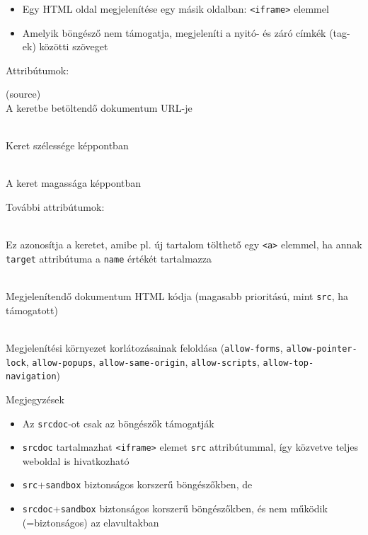\begin{frame}
  \begin{itemize}
    \item Egy HTML oldal megjelenítése egy másik oldalban: \texttt{<iframe>} elemmel
    \item Amelyik böngésző nem támogatja, megjeleníti a nyitó- és záró címkék (tag-ek) közötti szöveget
  \end{itemize}
  Attribútumok:
  \begin{description}[m]
    \item[\texttt{src}] (source) \hfill \\ A keretbe betöltendő dokumentum URL-je
    \item[\texttt{width}] \hfill \\ Keret szélessége képpontban
    \item[\texttt{height}] \hfill \\ A keret magassága képpontban
  \end{description}
\end{frame}

\begin{frame}
  További attribútumok:
  \begin{description}[m]
    \item[\texttt{name}] \hfill \\ Ez azonosítja a keretet, amibe pl. új tartalom tölthető egy \texttt{<a>} elemmel, ha annak \texttt{target} attribútuma a \texttt{name} értékét tartalmazza
    \item[\texttt{srcdoc}] \hfill \\ Megjelenítendő dokumentum HTML kódja (magasabb prioritású, mint \texttt{src}, ha támogatott)
    \item[\texttt{sandbox}] \hfill \\ Megjelenítési környezet korlátozásainak feloldása (\texttt{allow-forms}, \texttt{allow-pointer-lock}, \texttt{allow-popups}, \texttt{allow-same-origin}, \texttt{allow-scripts}, \texttt{allow-top-navigation}) 
  \end{description}
\end{frame}

\begin{frame}
  Megjegyzések
  \begin{itemize}
    \item Az \texttt{srcdoc}-ot csak az  böngészők támogatják
    \item \texttt{srcdoc} tartalmazhat \texttt{<iframe>} elemet \texttt{src} attribútummal, így közvetve teljes weboldal is hivatkozható
    \item \texttt{src}+\texttt{sandbox} biztonságos korszerű böngészőkben, de 
    \item \texttt{srcdoc}+\texttt{sandbox} biztonságos korszerű böngészőkben, és nem működik (=biztonságos) az elavultakban
  \end{itemize}
\end{frame}
